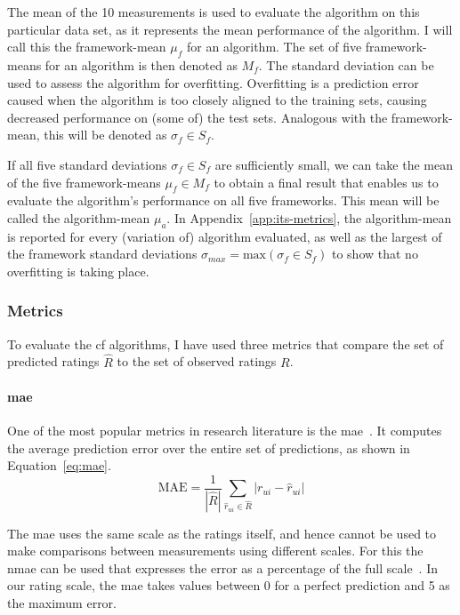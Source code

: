 The mean of the 10 measurements is used to evaluate the algorithm on this particular data set, as it represents the mean performance of the algorithm.
I will call this the framework-mean $\mu_f$ for an algorithm.
The set of five framework-means for an algorithm is then denoted as $M_f$.
The standard deviation can be used to assess the algorithm for overfitting.
Overfitting is a prediction error caused when the algorithm is too closely aligned to the training sets, causing decreased performance on (some of) the test sets.
Analogous with the framework-mean, this will be denoted as $\sigma_f \in S_f$.

If all five standard deviations $\sigma_f \in S_f$ are sufficiently small, we can take the mean of the five framework-means $\mu_f \in M_f$ to obtain a final result that enables us to evaluate the algorithm's performance on all five frameworks.
This mean will be called the algorithm-mean $\mu_{a}$.
In Appendix~\ref{app:its-metrics}, the algorithm-mean is reported for every (variation of) algorithm evaluated, as well as the largest of the framework standard deviations $\sigma_{max} = \text{max}(\sigma_f \in S_f)$ to show that no overfitting is taking place.

\subsubsection{Metrics}
To evaluate the \gls{cf} algorithms, I have used three metrics that compare the set of predicted ratings $\hat{R}$ to the set of observed ratings $R$.

\paragraph{\gls{mae}}
One of the most popular metrics in research literature is the \gls{mae}~\cite{sarwar2001item,su2009survey}.
It computes the average prediction error over the entire set of predictions, as shown in Equation~\ref{eq:mae}.
\begin{equation}
    \label{eq:mae}
    \text{MAE} = \frac{1}{ |\hat{R}| }  \sum\limits_{\hat{r}_{ui} \in \hat{R}} |r_{ui} - \hat{r}_{ui}|
\end{equation}

The \gls{mae} uses the same scale as the ratings itself, and hence cannot be used to make comparisons between measurements using different scales.
For this the \gls{nmae} can be used that expresses the error as a percentage of the full scale~\cite{su2009survey}.
In our rating scale, the \gls{mae} takes values between 0 for a perfect prediction and 5 as the maximum error.

